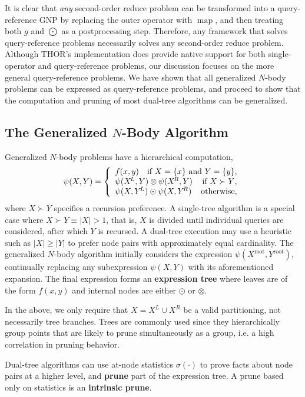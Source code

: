 \documentclass[twoside,leqno,twocolumn]{article}
\newcommand{\union}{\cup}
\newcommand{\prefsplit}[2]{#1 \succ #2}
\DeclareMathOperator*{\map}{map}
\newcommand{\gnp}{\psi}
\newcommand{\mysub}[1]{\subsection{#1} }
\newcommand{\defterm}[1]{{\bf #1}}
\newcommand{\kdroot}[1]{#1^{\text{root}}}
\newcommand{\kdleft}[1]{#1^{\!L}}
\newcommand{\kdright}[1]{#1^{\!R}}
\newcommand{\outstat}{\sigma}
\begin{document}
It is clear that {\em any} second-order reduce problem can be transformed into a query-reference GNP by replacing the outer operator with $\map$, and then treating both $g$ and $\bigodot$ as a postprocessing step.
Therefore, any framework that solves query-reference problems necessarily solves any second-order reduce problem.
Although THOR's implementation does provide native support for both single-operator and query-reference problems, our discussion focuses on the more general query-reference problems.
We have shown that all generalized $N$-body problems can be expressed as query-reference problems, and proceed to show that the computation and pruning of most dual-tree algorithms can be generalized.

\mysub{The Generalized $N$-Body Algorithm}
Generalized $N$-body problems have a hierarchical computation,
\[
\gnp(X,Y) = \left\{ \begin{array}{lrr}
    f(x,y) & \multicolumn{2}{r}{\text{if }X = \{x\}\text{ and }Y = \{y\}\text{,}}
    \\
    \multicolumn{2}{l}{\gnp(\kdleft{X},Y) \otimes \gnp(\kdright{X}, Y)} & \text{if }\prefsplit{X}{Y}\text{,}
    \\
    \multicolumn{2}{l}{\gnp(X,\kdleft{Y}) \odot \gnp(X,\kdright{Y})} & \text{otherwise,}
  \end{array}
\right.
\]
\noindent
where $\prefsplit{X}{Y}$ specifies a recursion preference.
A single-tree algorithm is a special case where $\prefsplit{X}{Y} \equiv |X| > 1$, that is, $X$ is divided until individual queries are considered, after which $Y$ is recursed.
A dual-tree execution may use a heuristic such as $|X| \geq |Y|$ to prefer node pairs with approximately equal cardinality.
The generalized $N$-body algorithm initially considers the expression $\gnp(\kdroot{X}, \kdroot{Y})$, continually replacing any subexpression $\gnp(X, Y)$ with its aforementioned expansion.
The final expression forms an \defterm{expression tree} where leaves are of the form $f(x,y)$ and internal nodes are either $\odot$ or $\otimes$.

In the above, we only require that $X = \kdleft{X} \union \kdright{X}$ be a valid partitioning, not necessarily tree branches.
Trees are commonly used since they hierarchically group points that are likely to prune simultaneously as a group, i.e. a high correlation in pruning behavior.

Dual-tree algorithms can use at-node statistics $\outstat(\cdot)$ to prove facts about node pairs at a higher level, and \defterm{prune} part of the expression tree.
A prune based only on statistics is an \defterm{intrinsic prune}.
\end{document}

